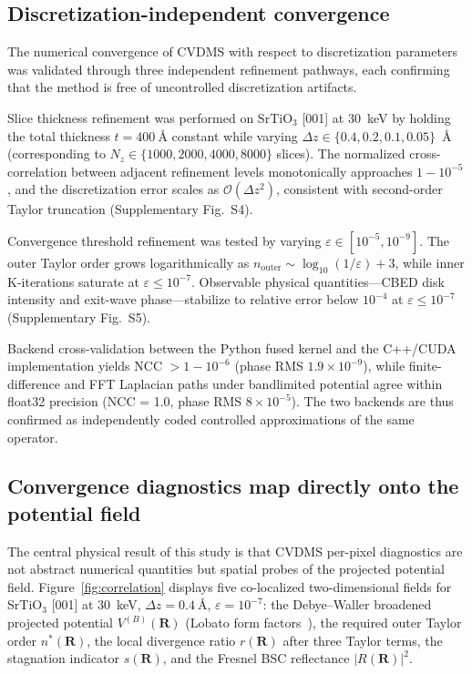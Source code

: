 \documentclass[twoside,11pt]{article}
\begin{document}
\subsection{Discretization-independent convergence}\label{sec:convergence}

The numerical convergence of CVDMS with respect to discretization parameters was validated through three independent refinement pathways, each confirming that the method is free of uncontrolled discretization artifacts.

Slice thickness refinement was performed on SrTiO$_3$ [001] at \SI{30}{\keV} by holding the total thickness $t=\SI{400}{\angstrom}$ constant while varying $\Delta z\in\{0.4,0.2,0.1,0.05\}$~\AA{} (corresponding to $N_z\in\{1000,2000,4000,8000\}$ slices). The normalized cross-correlation between adjacent refinement levels monotonically approaches $1-10^{-5}$, and the discretization error scales as $\mathcal O(\Delta z^2)$, consistent with second-order Taylor truncation (Supplementary Fig.~S4).

Convergence threshold refinement was tested by varying $\varepsilon\in[10^{-5},10^{-9}]$. The outer Taylor order grows logarithmically as $n_\text{outer}\sim\log_{10}(1/\varepsilon)+3$, while inner K-iterations saturate at $\varepsilon\le10^{-7}$. Observable physical quantities---CBED disk intensity and exit-wave phase---stabilize to relative error below $10^{-4}$ at $\varepsilon\le10^{-7}$ (Supplementary Fig.~S5).

Backend cross-validation between the Python fused kernel and the C++/CUDA implementation yields NCC $>1-10^{-6}$ (phase RMS $1.9\times10^{-9}$), while finite-difference and FFT Laplacian paths under bandlimited potential agree within float32 precision (NCC = 1.0, phase RMS $8\times10^{-5}$). The two backends are thus confirmed as independently coded controlled approximations of the same operator.



\subsection{Convergence diagnostics map directly onto the potential field}\label{sec:diagnostic-potential}

The central physical result of this study is that CVDMS per-pixel diagnostics are not abstract numerical quantities but spatial probes of the projected potential field. Figure~\ref{fig:correlation} displays five co-localized two-dimensional fields for SrTiO$_3$ [001] at \SI{30}{\keV}, $\Delta z=\SI{0.4}{\angstrom}$, $\varepsilon=10^{-7}$: the Debye--Waller broadened projected potential $V^{(B)}(\mathbf{R})$ (Lobato form factors~\cite{LobatoVanDyck2014}), the required outer Taylor order $n^*(\mathbf{R})$, the local divergence ratio $r(\mathbf{R})$ after three Taylor terms, the stagnation indicator $s(\mathbf{R})$, and the Fresnel BSC reflectance $|R(\mathbf{R})|^2$.
\end{document}
